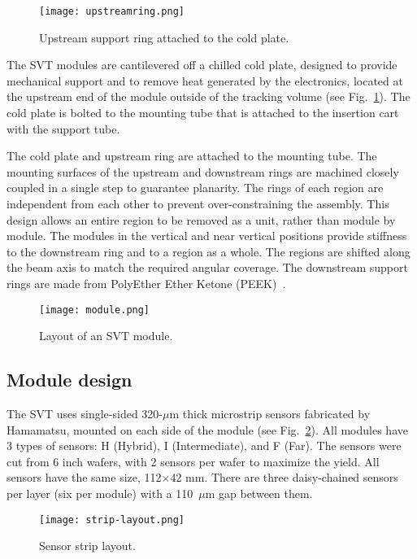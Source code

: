 \begin{figure}[hbt] 
\centering 
\texttt{[image: upstreamring.png]}
\caption{Upstream support ring attached to the cold plate.}
\label{fig:upstreamring}
\end{figure}

 The SVT modules are cantilevered off a chilled cold plate, designed to provide mechanical support and to remove heat generated by the electronics, located at the upstream end of the module outside of the tracking volume (see Fig.~\ref{fig:upstreamring}). The cold plate is bolted to the mounting tube that is attached to the insertion cart with the support tube. 
 
The cold plate and upstream ring are attached to the mounting tube. The mounting surfaces of the upstream and downstream rings are machined closely coupled in a single step to guarantee planarity. The rings of each region are independent from each other to prevent over-constraining the assembly. This design allows an entire region to be removed as a unit, rather than module by module. The modules in the vertical and near vertical positions provide stiffness to the downstream ring and to a region as a whole. The regions are shifted along the beam axis to match the required angular coverage. The downstream support rings are made from PolyEther Ether Ketone (PEEK)~\cite{NIMVCC}. 

\begin{figure}[hbt] 
\centering 
\texttt{[image: module.png]}
\caption{Layout of an SVT module.}
\label{fig:module}
\end{figure}

\subsection{Module design}

The SVT uses single-sided 320-$\mu$m thick microstrip sensors fabricated by Hamamatsu, mounted on each side of the module (see Fig.~\ref{fig:module}). All modules have 3 types of sensors: H (Hybrid), I (Intermediate), and F (Far). The sensors were cut from 6 inch wafers, with 2 sensors per wafer to maximize the yield. All sensors have the same size, 112$\times$42 mm. There are three daisy-chained sensors per layer (six per module) with a 110~$\mu$m gap between them. 

\begin{figure}[hbt] 
\centering 
\texttt{[image: strip-layout.png]}
\caption{Sensor strip layout.}
\label{fig:strip-layout}
\end{figure}

